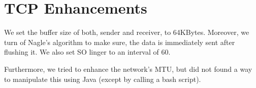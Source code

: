 \documentclass[12pt,a4paper]{article}
\begin{document}
\section{TCP Enhancements}
We set the buffer size of both, sender and receiver, to 64KBytes. Moreover, we turn of Nagle's algorithm to make sure, the data is immediately sent after flushing it. We also set SO linger to an interval of 60.

Furthermore, we tried to enhance the network's MTU, but did not found a way to manipulate this using Java (except by calling a bash script).
\end{document}
